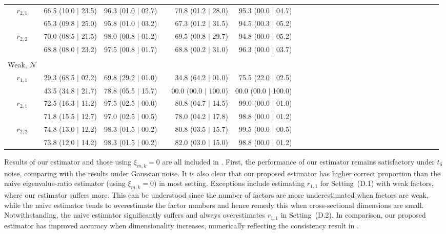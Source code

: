 \documentclass[aos]{imsart}
\theoremstyle{plain}
\theoremstyle{definition}
\def\cN{\mathcal{N}}
\begin{document}
\begin{table}
\begin{tabular}{@{}crrrrrrrrrrrrrrrrrrrrrrrrr@{}}
$r_{2,1}$ &  66.5 (10.0 $\mid$ 23.5) & 96.3 (01.0 $\mid$ 02.7) && 70.8 (01.2 $\mid$ 28.0) & 95.3 (00.0 $\mid$ 04.7) \\
          &  65.3 (09.8 $\mid$ 25.0) & 95.8 (01.0 $\mid$ 03.2) && 67.3 (01.2 $\mid$ 31.5) & 94.5 (00.3 $\mid$ 05.2) \\
$r_{2,2}$ &  70.0 (08.5 $\mid$ 21.5) & 98.0 (00.8 $\mid$ 01.2) && 69.5 (00.8 $\mid$ 29.7) & 94.8 (00.0 $\mid$ 05.2)  \\
          &  68.8 (08.0 $\mid$ 23.2) & 97.5 (00.8 $\mid$ 01.7) && 68.8 (00.2 $\mid$ 31.0) & 96.3 (00.0 $\mid$ 03.7) \\
\\
\multicolumn{1}{c}{Weak, $\cN$} \\
$r_{1,1}$ &  29.3 (68.5 $\mid$ 02.2) & 69.8 (29.2 $\mid$ 01.0) && 34.8 (64.2 $\mid$ 01.0) & 75.5 (22.0 $\mid$ 02.5) \\
          &  43.5 (34.8 $\mid$ 21.7) & 78.8 (05.5 $\mid$ 15.7) && 00.0 (00.0 $\mid$ 100.0) & 00.0 (00.0 $\mid$ 100.0) \\
$r_{2,1}$ &  72.5 (16.3 $\mid$ 11.2) & 97.5 (02.5 $\mid$ 00.0) && 80.8 (04.7 $\mid$ 14.5) & 99.0 (00.0 $\mid$ 01.0) \\
          &  71.8 (15.5 $\mid$ 12.7) & 97.0 (02.5 $\mid$ 00.5) && 78.0 (04.2 $\mid$ 17.8) & 98.8 (00.0 $\mid$ 01.2) \\
$r_{2,2}$ &  74.8 (13.0 $\mid$ 12.2) & 98.3 (01.5 $\mid$ 00.2) && 80.8 (03.5 $\mid$ 15.7) & 99.5 (00.0 $\mid$ 00.5)  \\
          &  73.8 (12.0 $\mid$ 14.2) & 98.3 (01.5 $\mid$ 00.2) && 82.0 (03.0 $\mid$ 15.0) & 98.8 (00.0 $\mid$ 01.2) \\
\hline %
\end{tabular}
\end{table}


Results of our estimator and those using $\xi_{m,k}=0$ are all included in . First, the performance of our estimator remains satisfactory under $t_6$ noise, comparing with the results under Gaussian noise. It is also clear that our proposed estimator has higher correct proportion than the naive eigenvalue-ratio estimator (using $\xi_{m,k}=0$) in most setting. Exceptions include estimating $r_{1,1}$ for Setting~(D.1) with weak factors, where our estimator suffers more. This can be understood since the number of factors are more underestimated when factors are weak, while the naive estimator tends to overestimate the factor numbers and hence remedy this when cross-sectional dimensions are small. Notwithstanding, the naive estimator significantly suffers and always overestimates $r_{1,1}$ in Setting~(D.2). In comparison, our proposed estimator has improved accuracy when dimensionality increases, numerically reflecting the consistency result in .
\end{document}

